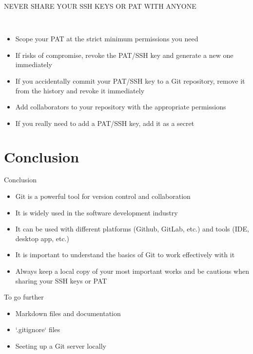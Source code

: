\documentclass[show notes on second screen=right]{beamer}
\begin{document}
\begin{frame}{}
  \onslide<+->
  \begin{center}
  \huge \color{red} NEVER SHARE YOUR SSH KEYS OR PAT WITH ANYONE
  \end{center}
  \normalsize
  \ 
  \onslide<+->
  \begin{itemize}
    \item Scope your PAT at the strict minimum permissions you need
    \item If risks of compromise, revoke the PAT/SSH key and generate a new one immediately
    \item If you accidentally commit your PAT/SSH key to a Git repository, remove it from the history and revoke it immediately
    \item Add collaborators to your repository with the appropriate permissions
    \item If you really need to add a PAT/SSH key, add it as a secret
  \end{itemize}
\end{frame}

\section{Conclusion}

\begin{frame}[t]{Conclusion}
  \begin{itemize}
    \item Git is a powerful tool for version control and collaboration
    \item It is widely used in the software development industry
    \item It can be used with different platforms (Github, GitLab, etc.) and tools (IDE, desktop app, etc.)
    \item It is important to understand the basics of Git to work effectively with it
    \item Always keep a local copy of your most important works and be cautious when sharing your SSH keys or PAT
  \end{itemize}
\end{frame}

\begin{frame}[t]{To go further}
  \begin{itemize}
    \item Markdown files and documentation
    \item `.gitignore` files
    \item Seeting up a Git server locally
  \end{itemize}
\end{frame}
\end{document}
